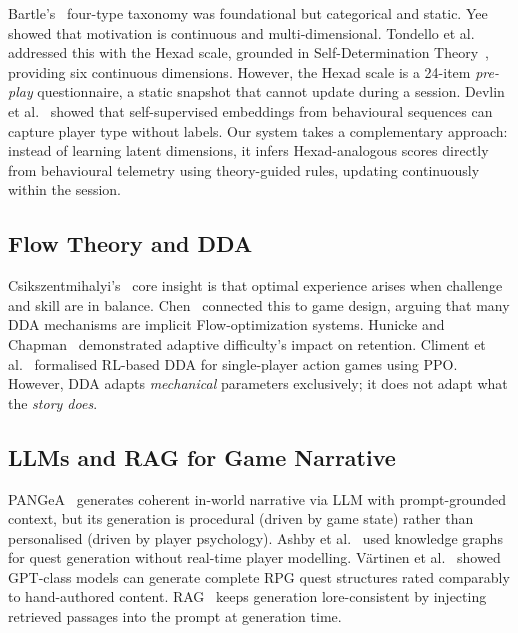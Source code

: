 \documentclass[conference]{IEEEtran}
\begin{document}
Bartle's~\cite{bartle1996hearts} four-type taxonomy was foundational but categorical and static. Yee~\cite{yee2006motivations} showed that motivation is continuous and multi-dimensional. Tondello et al.~\cite{tondello2016hexad} addressed this with the Hexad scale, grounded in Self-Determination Theory~\cite{ryan2000self}, providing six continuous dimensions. However, the Hexad scale is a 24-item \textit{pre-play} questionnaire, a static snapshot that cannot update during a session. Devlin et al.~\cite{devlin2024player2vec} showed that self-supervised embeddings from behavioural sequences can capture player type without labels. Our system takes a complementary approach: instead of learning latent dimensions, it infers Hexad-analogous scores directly from behavioural telemetry using theory-guided rules, updating continuously within the session.

\subsection{Flow Theory and DDA}

Csikszentmihalyi's~\cite{csikszentmihalyi1990flow} core insight is that optimal experience arises when challenge and skill are in balance. Chen~\cite{chen2007flow} connected this to game design, arguing that many DDA mechanisms are implicit Flow-optimization systems. Hunicke and Chapman~\cite{hunicke2004ai} demonstrated adaptive difficulty's impact on retention. Climent et al.~\cite{climent2024framework} formalised RL-based DDA for single-player action games using PPO. However, DDA adapts \textit{mechanical} parameters exclusively; it does not adapt what the \textit{story does}.

\subsection{LLMs and RAG for Game Narrative}

PANGeA~\cite{todd2024pangea} generates coherent in-world narrative via LLM with prompt-grounded context, but its generation is procedural (driven by game state) rather than personalised (driven by player psychology). Ashby et al.~\cite{ashby2023personalized} used knowledge graphs for quest generation without real-time player modelling. V\"artinen et al.~\cite{vartinen2024generating} showed GPT-class models can generate complete RPG quest structures rated comparably to hand-authored content. RAG~\cite{lewis2020retrieval} keeps generation lore-consistent by injecting retrieved passages into the prompt at generation time.
\end{document}
